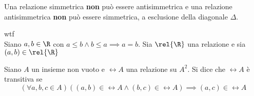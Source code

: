 \begin{remark}
    Una relazione simmetrica \textbf{non} può essere antisimmetrica e una relazione antisimmetrica \textbf{non} può essere simmetrica, a esclusione della diagonale \(\Delta\).
\end{remark}

\begin{example}
    {\Large wtf}\\
    Siano \(a,b \in \R\) con \(a \leq b \land b \leq a \implies a = b\). Sia \(\rel{\R}\) una relazione e sia \((a, b) \in \rel{\R}\)
\end{example}


\begin{definition}\label{def:relazione_transitiva}
    Siano \(A\) un insieme non vuoto e \(\rel{A}\) una relazione su \(A^2\). Si dice che \(\rel{A}\) è transitiva se
    \[
        (\forall a,b,c \in A) \left((a, b) \in \rel{A} \land (b, c) \in \rel{A}\right) \implies (a, c) \in \rel{A}
    \]
\end{definition}


